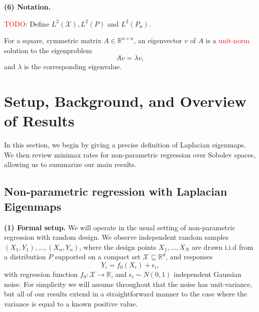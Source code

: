 \documentclass{article}
\newcommand{\Reals}{\mathbb{R}}
\newcommand{\1}{\mathbf{1}}
\newcommand{\Rd}{\Reals^d}
\newcommand{\Leb}{L}
\newcommand{\mc}[1]{\mathcal{#1}}
\theoremstyle{alden}
\theoremstyle{aldenthm}
\theoremstyle{definition}
\theoremstyle{remark}
\begin{document}
\textbf{(6) Notation.}

\textcolor{red}{TODO}: Define $\Leb^2(\mc{X}), \Leb^2(P)$ and $\Leb^2(P_n)$. 


For a square, symmetric matrix $A \in \Reals^{n \times n}$, an eigenvector $v$ of $A$ is a \textcolor{red}{unit-norm} solution to the eigenproblem
\begin{equation*}
Av = \lambda v,
\end{equation*}
and $\lambda$ is the corresponding eigenvalue.

\section{Setup, Background, and Overview of Results}
\label{sec:setup_main_results}

In this section, we begin by giving a precise definition of Laplacian eigenmaps. We then review minimax rates for non-parametric regression over Sobolev spaces, allowing us to summarize our main results. 

\subsection{Non-parametric regression with Laplacian Eigenmaps}
\label{sec:regression_laplacian_eigenmaps}

\textbf{(1) Formal setup.}
We will operate in the usual setting of non-parametric regression with random design. We observe independent random samples $(X_1,Y_1),\ldots,(X_n,Y_n)$, where the design points $X_1,\ldots,X_N$ are drawn i.i.d from a distribution $P$ supported on a compact set $\mc{X} \subseteq \Rd$, and responses
\begin{equation*}
Y_i = f_0(X_i) + \epsilon_i,
\end{equation*}
with regression function $f_0: \mc{X} \to \Reals$, and $\epsilon_i \sim N(0,1)$ independent Gaussian noise. For simplicity we will assume throughout that the noise has unit-variance, but all of our results extend in a straightforward manner to the case where the variance is equal to a known positive value. 
\end{document}
